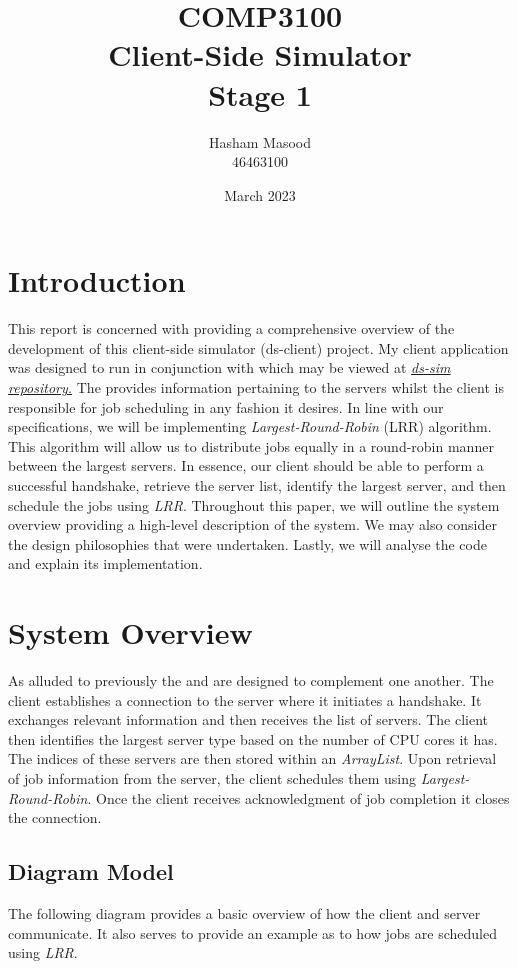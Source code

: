 \documentclass{article}
\title{COMP3100 \\ Client-Side Simulator \\ Stage 1  }
\author{Hasham Masood \\ 46463100}
\date{March 2023}
\begin{document}
\maketitle
\tableofcontents
\section{Introduction }
This report is concerned with providing a comprehensive overview of the development of this client-side simulator (ds-client) project. My client application was designed to run in conjunction with \textbf{} which may be viewed at \href{https://github.com/distsys-MQ/ds-sim}{\emph{ds-sim repository.}} The \textbf{} provides information pertaining to the servers whilst the client is responsible for job scheduling in any fashion it desires. In line with our specifications, we will be implementing \textit{Largest-Round-Robin} (LRR) algorithm. This algorithm will allow us to distribute jobs equally in a round-robin manner between the largest servers. In essence, our client should be able to perform a successful handshake, retrieve the server list, identify the largest server, and then schedule the jobs using \textit{LRR}. Throughout this paper, we will outline the system overview providing a high-level description of the system. We may also consider the design philosophies that were undertaken. Lastly, we will analyse the code and explain its implementation.

\section{System Overview}
As alluded to previously the \textbf{} and \textbf{} are designed to complement one another. The client establishes a connection to the server where it initiates a handshake. It exchanges relevant information and then receives the list of servers. The client then identifies the largest server type based on the number of CPU cores it has. The indices of these servers are then stored within an \emph{ArrayList}. Upon retrieval of job information from the server, the client schedules them using \emph{Largest-Round-Robin}. Once the client receives acknowledgment of job completion it closes the connection.

\subsection*{Diagram Model}
The following diagram provides a basic overview of how the client and server communicate. It also serves to provide an example as to how jobs are scheduled using \emph{LRR}.
\end{document}
